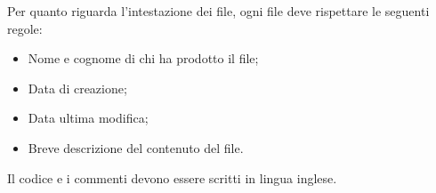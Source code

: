 Per quanto riguarda l'intestazione dei file, ogni file deve rispettare le seguenti regole: 
\begin{itemize}
	\item Nome e cognome di chi ha prodotto il file;
	\item Data di creazione;
	\item Data ultima modifica;
	\item Breve descrizione del contenuto del file.
\end{itemize} 

Il codice e i commenti devono essere scritti in lingua inglese.

